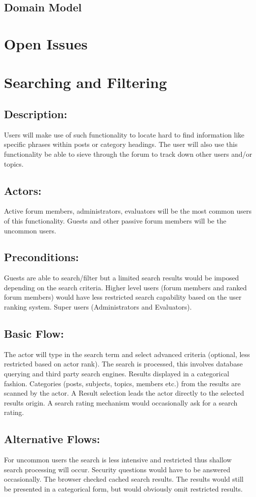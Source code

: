 \documentclass[12pt, oneside]{book}
\begin{document}
\subsection{Domain Model}
\section{Open Issues}


\section{Searching and Filtering}
\subsection{Description:}
Users will make use of such functionality to locate hard to find information like specific phrases within posts or category headings. The user will also use this functionality be able to sieve through the forum to track down other users and/or topics.  
\subsection{Actors:} 
Active forum members, administrators, evaluators will be the most common users of this functionality. Guests and other passive forum members will be the uncommon users.
\subsection{Preconditions:} 
Guests are able to search/filter but a limited search results would be imposed depending on the search criteria. Higher level users (forum members and ranked forum members) would have less restricted search capability based on the user ranking system. Super users (Administrators and Evaluators). \subsection{Basic Flow:} 
The actor will type in the search term and select advanced criteria (optional, less restricted based on actor rank). The search is processed, this involves database querying and third party search engines. Results displayed in a categorical fashion. Categories (posts, subjects, topics, members etc.) from the results are scanned by the actor. A Result selection leads the actor directly to the selected results origin. A search rating mechanism would occasionally ask for a search rating.  
\subsection{Alternative Flows:} 
For uncommon users the search is less intensive and restricted thus shallow search processing will occur. Security questions would have to be answered occasionally. The browser checked cached search results. The results would still be presented in a categorical form, but would obviously omit restricted results. 
\end{document}
